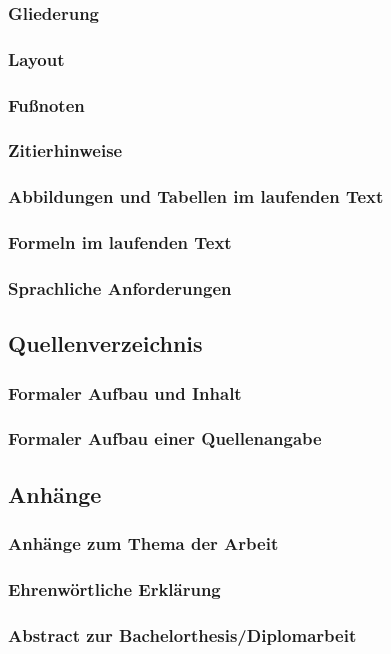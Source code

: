 \subsubsection{Gliederung}
\label{formal-gestaltung-textteil-gliederung}
\subsubsection{Layout}
\label{formal-gestaltung-textteil-layout}
\subsubsection{Fußnoten}
\label{formal-gestaltung-textteil-fn}
\subsubsection{Zitierhinweise}
\label{formal-gestaltung-textteil-zitierhinweise}
\subsubsection{Abbildungen und Tabellen im laufenden Text}
\label{formal-gestaltung-textteil-fig-tab-fliesstext}
\subsubsection{Formeln im laufenden Text}
\label{formal-gestaltung-textteil-formeln-fliesstext}
\subsubsection{Sprachliche Anforderungen}
\label{formal-gestaltung-textteil-sprache}
\subsection{Quellenverzeichnis}
\label{formal-gestaltung-quellenverzeichnis}
\subsubsection{Formaler Aufbau und Inhalt}
\label{formal-gestaltung-quellenverzeichnis-inhalt}
\subsubsection{Formaler Aufbau einer Quellenangabe}
\label{formal-gestaltung-quellenverzeichnis-quelle}
\subsection{Anhänge}
\label{formal-gestaltung-anhaenge}
\subsubsection{Anhänge zum Thema der Arbeit}
\label{formal-gestaltung-anhaenge-anhaenge}
\subsubsection{Ehrenwörtliche Erklärung}
\label{formal-gestaltung-anhaenge-erklaerung}
\subsubsection{Abstract zur Bachelorthesis/Diplomarbeit}
\label{formal-gestaltung-anhaenge-abstract}
